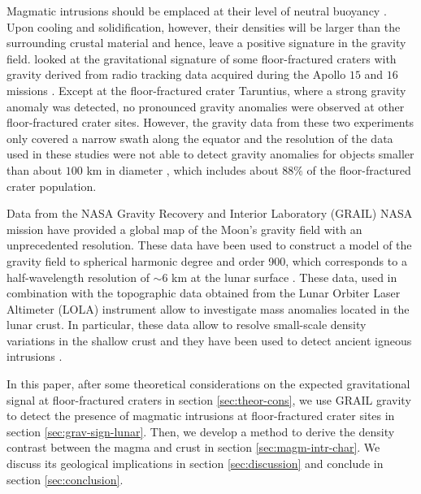 Magmatic  intrusions should  be  emplaced at  their  level of  neutral
buoyancy \citep{Walker:1989jq,Taisne:2009kj,Wichman:1995ju}.
Upon  cooling and  solidification,  however, their  densities will  be
larger  than  the surrounding  crustal  material  and hence,  leave  a
positive  signature  in  the  gravity  field.   \citet{Schultz:1976kt}
looked at the gravitational  signature of some floor-fractured craters
with  gravity derived  from radio  tracking data  acquired during  the
Apollo $15$  and $16$  missions \citep{Sjogren:1972kk,Sjogren:1974ij}.
Except at the floor-fractured crater Taruntius, where a strong gravity
anomaly was detected, no pronounced gravity anomalies were observed at
other floor-fractured  crater sites.   However, the gravity  data from
these two  experiments only covered  a narrow swath along  the equator
and the resolution of the data used  in these studies were not able to
detect gravity  anomalies for objects  smaller than about $100$  km in
diameter  \citep{Schultz:1976kt,Sjogren:1974ij}, which  includes about
$88\%$ of the floor-fractured crater population.

Data from  the NASA Gravity  Recovery and Interior  Laboratory (GRAIL)
NASA mission  have provided a global  map of the Moon's  gravity field
with  an  unprecedented resolution.   These  data  have been  used  to
construct a  model of the  gravity field to spherical  harmonic degree
and order  900, which corresponds  to a half-wavelength  resolution of
$\sim 6$ km at the lunar surface \citep{Zuber:2013cp,Konopliv:2014gm}.
These data,  used in  combination with  the topographic  data obtained
from  the Lunar  Orbiter Laser  Altimeter (LOLA)  instrument allow  to
investigate mass anomalies located in the lunar crust.  In particular,
these  data allow  to resolve  small-scale density  variations in  the
shallow crust \citep{Besserer:2014jr,Wieczorek:2013ipa}  and they have
been     used     to     detect     ancient     igneous     intrusions
\citep{AndrewsHanna:2013ft}.

In this paper,  after some theoretical considerations  on the expected
gravitational   signal   at   floor-fractured   craters   in   section
\ref{sec:theor-cons}, we use  GRAIL gravity to detect  the presence of
magmatic  intrusions  at  floor-fractured   crater  sites  in  section
\ref{sec:grav-sign-lunar}.  Then,  we develop  a method to  derive the
density   contrast   between   the   magma  and   crust   in   section
\ref{sec:magm-intr-char}.  We  discuss its geological  implications in
section     \ref{sec:discussion}    and     conclude    in     section
\ref{sec:conclusion}.

